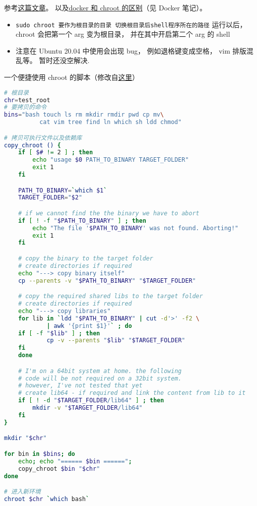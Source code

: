 
\begin{issues}
\issueDraft
\end{issues}

参考\href{https://www.howtogeek.com/441534/how-to-use-the-chroot-command-on-linux/}{这篇文章}。
以及\href{https://devops.stackexchange.com/questions/2826/difference-between-chroot-and-docker}{docker 和 chroot 的区别}（见 Docker 笔记）。

\begin{itemize}
\item \verb|sudo chroot 要作为根目录的目录 切换根目录后shell程序所在的路径| 运行以后， chroot 会把第一个 arg 变为根目录， 并在其中开启第二个 arg 的 shell
\item 注意在 Ubuntu 20.04 中使用会出现 bug， 例如退格键变成空格， vim 排版混乱等。 暂时还没空解决.
\end{itemize}

一个便捷使用 chroot 的脚本（修改自\href{https://gist.github.com/xmonader/5d1fc6134f1f65acd0d10f71453adb27}{这里}）

\begin{lstlisting}[language=bash]
# 根目录
chr=test_root
# 要拷贝的命令
bins="bash touch ls rm mkdir rmdir pwd cp mv\
          cat vim tree find ln which sh ldd chmod"

# 拷贝可执行文件以及依赖库
copy_chroot () {
	if [ $# != 2 ] ; then
		echo "usage $0 PATH_TO_BINARY TARGET_FOLDER"
		exit 1
	fi

	PATH_TO_BINARY=`which $1`
	TARGET_FOLDER="$2"

	# if we cannot find the the binary we have to abort
	if [ ! -f "$PATH_TO_BINARY" ] ; then
		echo "The file '$PATH_TO_BINARY' was not found. Aborting!"
		exit 1
	fi

	# copy the binary to the target folder
	# create directories if required
	echo "---> copy binary itself"
	cp --parents -v "$PATH_TO_BINARY" "$TARGET_FOLDER"

	# copy the required shared libs to the target folder
	# create directories if required
	echo "---> copy libraries"
	for lib in `ldd "$PATH_TO_BINARY" | cut -d'>' -f2 \
            | awk '{print $1}'` ; do
	if [ -f "$lib" ] ; then
			cp -v --parents "$lib" "$TARGET_FOLDER"
	fi  
	done

	# I'm on a 64bit system at home. the following
    # code will be not required on a 32bit system.
	# however, I've not tested that yet
	# create lib64 - if required and link the content from lib to it
	if [ ! -d "$TARGET_FOLDER/lib64" ] ; then
		mkdir -v "$TARGET_FOLDER/lib64"
	fi
}

mkdir "$chr"

for bin in $bins; do
	echo; echo "====== $bin ======";
	copy_chroot $bin "$chr"
done

# 进入新环境
chroot $chr `which bash`
\end{lstlisting}
